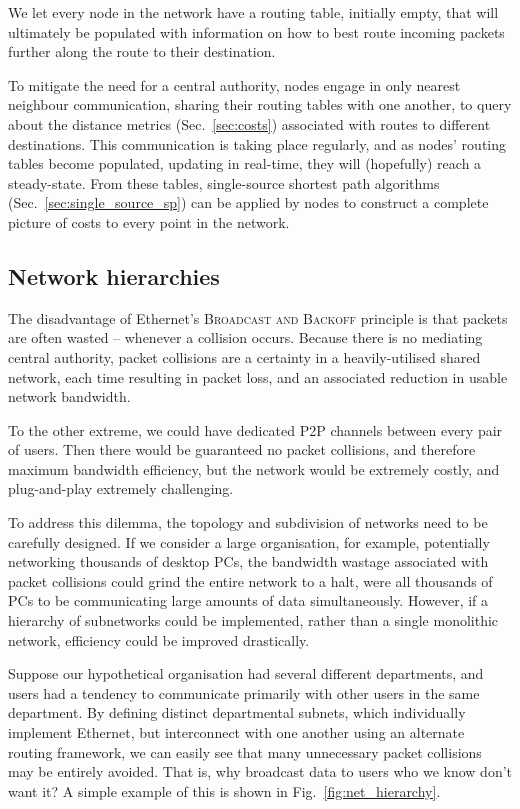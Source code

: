 \documentclass[aps, rmp, twocolumn, amsmath, amssymb, nofootinbib, superscriptaddress, longbibliography, floatfix, table-of-contents, eqsecnum]{revtex4-1}
\begin{document}
We let every node in the network have a routing table, initially empty, that will ultimately be populated with information on how to best route incoming packets further along the route to their destination.

To mitigate the need for a central authority, nodes engage in only nearest neighbour communication, sharing their routing tables with one another, to query about the distance metrics (Sec.~\ref{sec:costs}) associated with routes to different destinations. This communication is taking place regularly, and as nodes' routing tables become populated, updating in real-time, they will (hopefully) reach a steady-state. From these tables, single-source shortest path algorithms (Sec.~\ref{sec:single_source_sp}) can be applied by nodes to construct a complete picture of costs to every point in the network.

%
%

\subsection{Network hierarchies} 

The disadvantage of Ethernet's \textsc{Broadcast and Backoff} principle is that packets are often wasted -- whenever a collision occurs. Because there is no mediating central authority, packet collisions are a certainty in a heavily-utilised shared network, each time resulting in packet loss, and an associated reduction in usable network bandwidth.

To the other extreme, we could have dedicated P2P channels between every pair of users. Then there would be guaranteed no packet collisions, and therefore maximum bandwidth efficiency, but the network would be extremely costly, and plug-and-play extremely challenging.

To address this dilemma, the topology and subdivision of networks need to be carefully designed. If we consider a large organisation, for example, potentially networking thousands of desktop PCs, the bandwidth wastage associated with packet collisions could grind the entire network to a halt, were all thousands of PCs to be communicating large amounts of data simultaneously. However, if a hierarchy of subnetworks could be implemented, rather than a single monolithic network, efficiency could be improved drastically.

Suppose our hypothetical organisation had several different departments, and users had a tendency to communicate primarily with other users in the same department. By defining distinct departmental subnets, which individually implement Ethernet, but interconnect with one another using an alternate routing framework, we can easily see that many unnecessary packet collisions may be entirely avoided. That is, why broadcast data to users who we know don't want it? A simple example of this is shown in Fig.~\ref{fig:net_hierarchy}.
\end{document}
